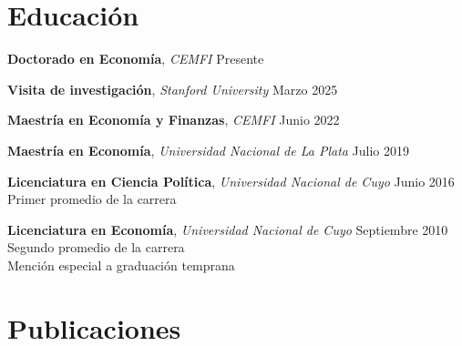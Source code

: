 \documentclass[margin,center,a4paper]{res}
\begin{document}
	\address{daniel.fernandez@cemfi.edu.es}
	\begin{resume}
		\section{Educación}
		
		\textbf{Doctorado en Economía}, {\sl CEMFI} \hfill Presente \vspace{-0.75em}
		
		\textbf{Visita de investigación}, {\sl Stanford University} \hfill Marzo 2025\vspace{-0.75em}
		
		\textbf{Maestría en Economía y Finanzas}, {\sl CEMFI} \hfill Junio 2022\vspace{-0.75em}
		
		\textbf{Maestría en Economía}, {\sl Universidad Nacional de La Plata} \hfill Julio 2019\vspace{-0.75em}
		
		\textbf{Licenciatura en Ciencia Política}, {\sl Universidad Nacional de Cuyo} \hfill Junio 2016 \\
		\hspace*{0.3in}\textbullet{} Primer promedio de la carrera \vspace{-0.75em}
		
		\textbf{Licenciatura en Economía}, {\sl Universidad Nacional de Cuyo} \hfill Septiembre 2010 \\
		\hspace*{0.3in}\textbullet{} Segundo promedio de la carrera \\
		\hspace*{0.3in}\textbullet{} Mención especial a graduación temprana
		\section{Publicaciones}
		

\end{resume}
\end{document}
